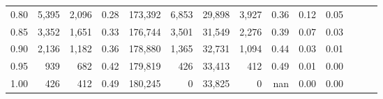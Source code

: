 \begin{tabular}{rrrrrrrrrrrrrr}
0.80 &   5,395 &  2,096 &  0.28 &  173,392 &    6,853 &  29,898 &   3,927 &  0.36 &  0.12 &      0.05 \\
0.85 &   3,352 &  1,651 &  0.33 &  176,744 &    3,501 &  31,549 &   2,276 &  0.39 &  0.07 &      0.03 \\
0.90 &   2,136 &  1,182 &  0.36 &  178,880 &    1,365 &  32,731 &   1,094 &  0.44 &  0.03 &      0.01 \\
0.95 &     939 &    682 &  0.42 &  179,819 &      426 &  33,413 &     412 &  0.49 &  0.01 &      0.00 \\
1.00 &     426 &    412 &  0.49 &  180,245 &        0 &  33,825 &       0 &   nan &  0.00 &      0.00 \\
\bottomrule
\end{tabular}
